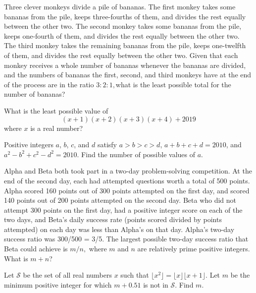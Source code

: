 \documentclass[blue,onecol]{shooting}
\begin{document}
\begin{prob}[AIME II 2004/6]{3}
Three clever monkeys divide a pile of bananas. The first monkey takes some bananas from the pile, keeps three-fourths of them, and divides the rest equally between the other two. The second monkey takes some bananas from the pile, keeps one-fourth of them, and divides the rest equally between the other two. The third monkey takes the remaining bananas from the pile, keeps one-twelfth of them, and divides the rest equally between the other two. Given that each monkey receives a whole number of bananas whenever the bananas are divided, and the numbers of bananas the first, second, and third monkeys have at the end of the process are in the ratio $3: 2: 1,$what is the least possible total for the number of bananas?
\end{prob} 

\begin{prob}[AMC 10A 2019/19]{3}
What is the least possible value of\[(x+1)(x+2)(x+3)(x+4)+2019\]where $x$ is a real number?
\end{prob}  

\begin{prob}[AIME I 2010/5]{3}
Positive integers $a$, $b$, $c$, and $d$ satisfy $a > b > c > d$, $a + b + c + d = 2010$, and $a^2 - b^2 + c^2 - d^2 = 2010$. Find the number of possible values of $a$.
\end{prob} 

\begin{prob}[AIME I 2004/5]{4}
Alpha and Beta both took part in a two-day problem-solving competition. At the end of the second day, each had attempted questions worth a total of 500 points. Alpha scored 160 points out of 300 points attempted on the first day, and scored 140 points out of 200 points attempted on the second day. Beta who did not attempt 300 points on the first day, had a positive integer score on each of the two days, and Beta's daily success rate (points scored divided by points attempted) on each day was less than Alpha's on that day. Alpha's two-day success ratio was 300/500 = 3/5. The largest possible two-day success ratio that Beta could achieve is $m/n,$ where $m$ and $n$ are relatively prime positive integers. What is $m+n$?
\end{prob} 

\begin{prob}[]{4}
Let $\mathcal{S}$ be the set of all real numbers $x$ such that $\lfloor x^2\rfloor=\lfloor x\rfloor\lfloor x+1\rfloor$. Let $m$ be the minimum positive integer for which $m+0.51$ is not in $\mathcal{S}$. Find $m$. 
\end{prob} 
\end{document}
